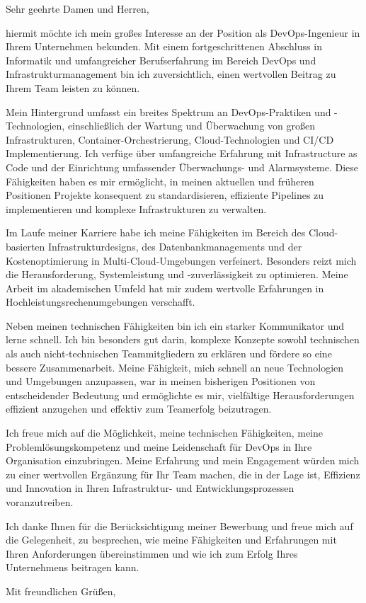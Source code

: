 \documentclass[]{main}
\begin{document}
\begin{letter}{}
    \vspace*{-12\baselineskip}
    \opening{Sehr geehrte Damen und Herren,}
    \vspace{1em}

    hiermit möchte ich mein großes Interesse an der Position als DevOps-Ingenieur in Ihrem Unternehmen bekunden. Mit einem fortgeschrittenen Abschluss in Informatik und umfangreicher Berufserfahrung im Bereich DevOps und Infrastrukturmanagement bin ich zuversichtlich, einen wertvollen Beitrag zu Ihrem Team leisten zu können.

    Mein Hintergrund umfasst ein breites Spektrum an DevOps-Praktiken und -Technologien, einschließlich der Wartung und Überwachung von großen Infrastrukturen, Container-Orchestrierung, Cloud-Technologien und CI/CD Implementierung. Ich verfüge über umfangreiche Erfahrung mit Infrastructure as Code und der Einrichtung umfassender Überwachungs- und Alarmsysteme. Diese Fähigkeiten haben es mir ermöglicht, in meinen aktuellen und früheren Positionen Projekte konsequent zu standardisieren, effiziente Pipelines zu implementieren und komplexe Infrastrukturen zu verwalten.

    Im Laufe meiner Karriere habe ich meine Fähigkeiten im Bereich des Cloud-basierten Infrastrukturdesigns, des Datenbankmanagements und der Kostenoptimierung in Multi-Cloud-Umgebungen verfeinert. Besonders reizt mich die Herausforderung, Systemleistung und -zuverlässigkeit zu optimieren. Meine Arbeit im akademischen Umfeld hat mir zudem wertvolle Erfahrungen in Hochleistungsrechenumgebungen verschafft.

    Neben meinen technischen Fähigkeiten bin ich ein starker Kommunikator und lerne schnell. Ich bin besonders gut darin, komplexe Konzepte sowohl technischen als auch nicht-technischen Teammitgliedern zu erklären und fördere so eine bessere Zusammenarbeit. Meine Fähigkeit, mich schnell an neue Technologien und Umgebungen anzupassen, war in meinen bisherigen Positionen von entscheidender Bedeutung und ermöglichte es mir, vielfältige Herausforderungen effizient anzugehen und effektiv zum Teamerfolg beizutragen.

    Ich freue mich auf die Möglichkeit, meine technischen Fähigkeiten, meine Problemlösungskompetenz und meine Leidenschaft für DevOps in Ihre Organisation einzubringen. Meine Erfahrung und mein Engagement würden mich zu einer wertvollen Ergänzung für Ihr Team machen, die in der Lage ist, Effizienz und Innovation in Ihren Infrastruktur- und Entwicklungsprozessen voranzutreiben.

    Ich danke Ihnen für die Berücksichtigung meiner Bewerbung und freue mich auf die Gelegenheit, zu besprechen, wie meine Fähigkeiten und Erfahrungen mit Ihren Anforderungen übereinstimmen und wie ich zum Erfolg Ihres Unternehmens beitragen kann.

    \vspace{3em}
    \closing{Mit freundlichen Grüßen,\\\name}
\end{letter}
\end{document}
